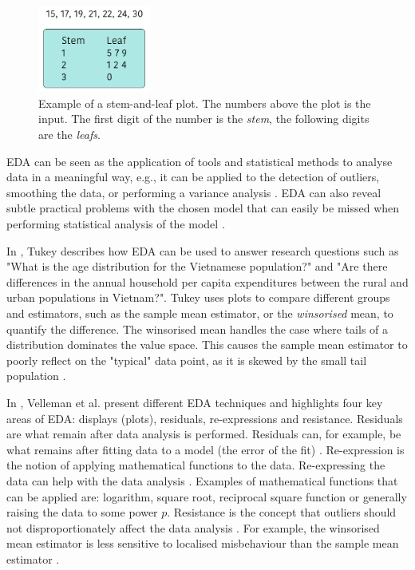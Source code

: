 \begin{figure} [h!]
    \centering
    \includegraphics[width=0.33\textwidth]{figures/stem-leaf-plot}
    \caption[Example of a stem-and-leaf plot]
    {\small Example of a stem-and-leaf plot. The numbers above the plot is the input.
    The first digit of the number is the \emph{stem}, the following digits are the \emph{leafs}.}
    \label{fig:stem-leaf-plot}
\end{figure}

EDA can be seen as the application of tools and statistical methods to analyse data in a meaningful way, e.g., it can be applied to the detection of outliers, smoothing the data, or performing a variance analysis \cite{Anselin1999, Hoaglin2003, Tukey1977, Velleman1981}.
EDA can also reveal subtle practical problems with the chosen model that can easily be missed when performing statistical analysis of the model \cite{Gelman2003}.

In \cite{Tukey1977}, Tukey describes how EDA can be used to answer research questions such as "What is the age distribution for the Vietnamese population?" and "Are there differences in
the annual household per capita expenditures between the rural and urban populations in Vietnam?".
Tukey uses plots to compare different groups and estimators, such as the sample mean estimator, or the \emph{winsorised} mean, to quantify the difference.
The winsorised mean handles the case where tails of a distribution dominates the value space.  
This causes the sample mean estimator to poorly reflect on the "typical" data point, as it is skewed by the small tail population \cite{Tukey1977}.

In \cite{Velleman1981}, Velleman et al. present different EDA techniques and highlights four key areas of EDA: displays (plots), residuals, re-expressions and resistance.
Residuals are what remain after data analysis is performed.
Residuals can, for example, be what remains after fitting data to a model (the error of the fit) \cite{Velleman1981}.
Re-expression is the notion of applying mathematical functions to the data.
Re-expressing the data can help with the data analysis \cite{Hoaglin2003, Velleman1981}.
Examples of mathematical functions that can be applied are: logarithm, square root, reciprocal square function or generally raising the data to some power $p$.
Resistance is the concept that outliers should not disproportionately affect the data analysis \cite{Hoaglin2003, Velleman1981}.
For example, the winsorised mean estimator is less sensitive to localised misbehaviour than the sample mean estimator \cite{Tukey1977}.

